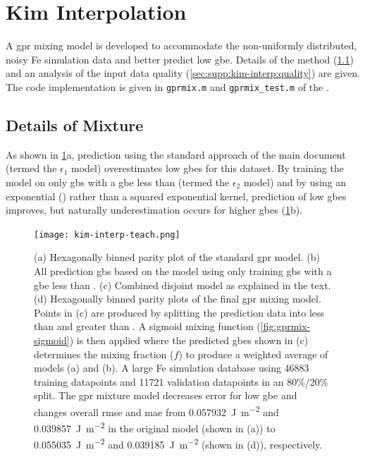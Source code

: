 \documentclass[preprint,12pt]{elsarticle}
\begin{document}
	
	
	\section{Kim Interpolation}
	\label{sec:supp:kim-interp}
	
	A \gls{gpr} mixing model is developed to accommodate the non-uniformly distributed, noisy Fe simulation data \cite{kimPhasefieldModeling3D2014} and better predict low \gls{gbe}. Details of the method (\cref{sec:supp:kim-interp:method}) and an analysis of the input data quality (\cref{sec:supp:kim-interp:quality}) are given. The code implementation is given in \texttt{gprmix.m} and \texttt{gprmix\_test.m} of the \vfzorepo{} \cite{bairdFiveDegreeofFreedom5DOF2020}.
	
	\subsection{Details of  Mixture}
	\label{sec:supp:kim-interp:method}
	As shown in \cref{fig:kim-interp-teach}a, prediction using the standard approach of the main document (termed the $\epsilon_1$ model) overestimates low \glspl{gbe} for this dataset. By training the model on only \glspl{gb} with a \gls{gbe} less than \thrtwo{} (termed the $\epsilon_2$ model) and by using an exponential () rather than a squared exponential kernel, prediction of low \glspl{gbe} improves, but naturally underestimation occurs for higher \glspl{gbe} (\cref{fig:kim-interp-teach}b).
	
	\begin{figure}
		\centering
		\texttt{[image: kim-interp-teach.png]}
		\caption{(a) Hexagonally binned parity plot of the standard \gls{gpr} model. (b) All prediction \glspl{gb} based on the model using only training \glspl{gb} with a \gls{gbe} less than \thrtwo{}. (c) Combined disjoint model as explained in the text. (d) Hexagonally binned parity plots of the final \gls{gpr} mixing model. Points in (c) are produced by splitting the prediction data into less than and greater than \thr{}. A sigmoid mixing function (\cref{fig:gprmix-sigmoid}) is then applied where the predicted \glspl{gbe} shown in (c) determines the mixing fraction ($f$) to produce a weighted average of models (a) and (b). A large Fe simulation database \cite{kimPhasefieldModeling3D2014} using \num{46883} training datapoints and \num{11721} validation datapoints in an 80\%/20\% split. The \gls{gpr} mixture model decreases error for low \gls{gbe} and changes overall \gls{rmse} and \gls{mae} from \SI{0.057932}{\J\per\square\meter} and \SI{0.039857}{\J\per\square\meter} in the original model (shown in (a)) to \SI{0.055035}{\J\per\square\meter} and \SI{0.039185}{\J\per\square\meter} (shown in (d)), respectively.}
		\label{fig:kim-interp-teach}
	\end{figure}
	
\end{document}

